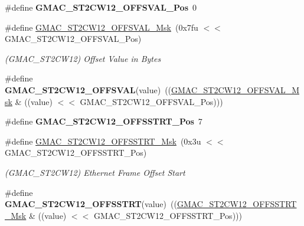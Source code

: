 \begin{DoxyCompactItemize}
\item 
\mbox{\label{group__SAME70__GMAC_gacb62221fe252fe05198b07e20393c225}} 
\#define {\bfseries G\+M\+A\+C\+\_\+\+S\+T2\+C\+W12\+\_\+\+O\+F\+F\+S\+V\+A\+L\+\_\+\+Pos}~0
\item 
\mbox{\label{group__SAME70__GMAC_ga95bfca3d28bc1c0f4d0b3971255161fa}} 
\#define \mbox{\hyperlink{group__SAME70__GMAC_ga95bfca3d28bc1c0f4d0b3971255161fa}{G\+M\+A\+C\+\_\+\+S\+T2\+C\+W12\+\_\+\+O\+F\+F\+S\+V\+A\+L\+\_\+\+Msk}}~(0x7fu $<$$<$ G\+M\+A\+C\+\_\+\+S\+T2\+C\+W12\+\_\+\+O\+F\+F\+S\+V\+A\+L\+\_\+\+Pos)
\begin{DoxyCompactList}\small\item\em (G\+M\+A\+C\+\_\+\+S\+T2\+C\+W12) Offset Value in Bytes \end{DoxyCompactList}\item 
\mbox{\label{group__SAME70__GMAC_gad354e4f5c8e423c82f9bd04b5ed78969}} 
\#define {\bfseries G\+M\+A\+C\+\_\+\+S\+T2\+C\+W12\+\_\+\+O\+F\+F\+S\+V\+AL}(value)~((\mbox{\hyperlink{group__SAMV71__GMAC_ga95bfca3d28bc1c0f4d0b3971255161fa}{G\+M\+A\+C\+\_\+\+S\+T2\+C\+W12\+\_\+\+O\+F\+F\+S\+V\+A\+L\+\_\+\+Msk}} \& ((value) $<$$<$ G\+M\+A\+C\+\_\+\+S\+T2\+C\+W12\+\_\+\+O\+F\+F\+S\+V\+A\+L\+\_\+\+Pos)))
\item 
\mbox{\label{group__SAME70__GMAC_gac98296b0f102a390a351434f6a216585}} 
\#define {\bfseries G\+M\+A\+C\+\_\+\+S\+T2\+C\+W12\+\_\+\+O\+F\+F\+S\+S\+T\+R\+T\+\_\+\+Pos}~7
\item 
\mbox{\label{group__SAME70__GMAC_ga220e5d51f50d08df75307f2da7f55e42}} 
\#define \mbox{\hyperlink{group__SAME70__GMAC_ga220e5d51f50d08df75307f2da7f55e42}{G\+M\+A\+C\+\_\+\+S\+T2\+C\+W12\+\_\+\+O\+F\+F\+S\+S\+T\+R\+T\+\_\+\+Msk}}~(0x3u $<$$<$ G\+M\+A\+C\+\_\+\+S\+T2\+C\+W12\+\_\+\+O\+F\+F\+S\+S\+T\+R\+T\+\_\+\+Pos)
\begin{DoxyCompactList}\small\item\em (G\+M\+A\+C\+\_\+\+S\+T2\+C\+W12) Ethernet Frame Offset Start \end{DoxyCompactList}\item 
\mbox{\label{group__SAME70__GMAC_ga0544cfc06eab3c580a04d4129e6fc718}} 
\#define {\bfseries G\+M\+A\+C\+\_\+\+S\+T2\+C\+W12\+\_\+\+O\+F\+F\+S\+S\+T\+RT}(value)~((\mbox{\hyperlink{group__SAMV71__GMAC_ga220e5d51f50d08df75307f2da7f55e42}{G\+M\+A\+C\+\_\+\+S\+T2\+C\+W12\+\_\+\+O\+F\+F\+S\+S\+T\+R\+T\+\_\+\+Msk}} \& ((value) $<$$<$ G\+M\+A\+C\+\_\+\+S\+T2\+C\+W12\+\_\+\+O\+F\+F\+S\+S\+T\+R\+T\+\_\+\+Pos)))

\end{DoxyCompactItemize}
